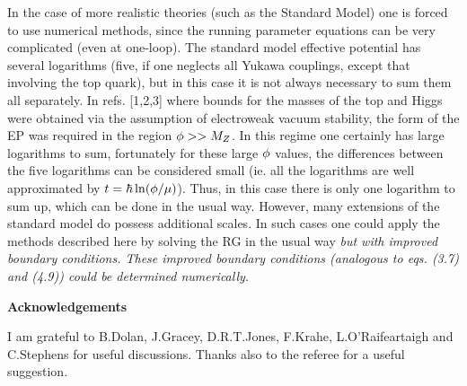 In the case of more realistic theories (such as the Standard
Model) one is forced to use
numerical methods, since the running parameter equations
 can be very
complicated (even at one-loop). The standard model effective
potential has several logarithms (five, if one neglects all
Yukawa couplings, except that involving the top quark), but in this
case it is not always necessary to sum them all separately. In refs.
[1,2,3] where bounds for the masses of the top and Higgs were
obtained via the assumption of electroweak vacuum stability, the
form of the EP was required in the region $\phi>>M_Z$. In this regime
one certainly has large logarithms to sum, fortunately for these
large $\phi$ values, the differences between the five logarithms
can be considered small (ie. all the logarithms are well approximated
by $t=\hbar\ln(\phi/\mu)$). Thus, in this case there is only one
logarithm to sum up, which can be done in the usual way. However,
many extensions of the standard model  do possess additional scales.
In such cases one could apply the methods described here by solving
the RG in the usual way \sl but with improved boundary conditions.
\rm These improved boundary conditions (analogous to eqs. (3.7)
and (4.9))  could be determined numerically.
\line{\hfill}
\line{\hfill}
\centerline{\fourteenpoint \bf Acknowledgements}
\line{\hfill}
\line{\hfill}

I am grateful to  B.Dolan,
J.Gracey, D.R.T.Jones, F.Krahe, L.O'Raifeartaigh and
C.Stephens
 for useful discussions. Thanks also to the referee for a
useful suggestion.
 \line{\hfill}
\line{\hfill}


